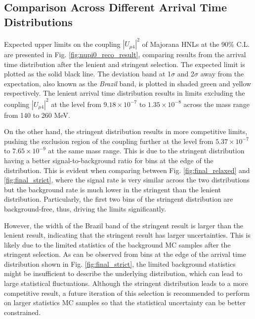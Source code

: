 \subsection{Comparison Across Different Arrival Time Distributions}

Expected upper limits on the coupling $|U_{\mu4}|^2$ of Majorana HNLs at the 90\% C.L. are presented in Fig. \ref{fig:nupi0_reco_result}, comparing results from the arrival time distribution after the lenient and stringent selection.
The expected limit is plotted as the solid black line.
The deviation band at 1$\sigma$ and 2$\sigma$ away from the expectation, also known as the \textit{Brazil} band, is plotted in shaded green and yellow respectively.
The lenient arrival time distribution results in limits excluding the coupling $|U_{\mu4}|^2$ at the level from $9.18 \times 10^{-7}$ to $1.35 \times 10^{-8}$ across the mass range from 140 to 260 MeV.

On the other hand, the stringent distribution results in more competitive limits, pushing the exclusion region of the coupling further at the level from $5.37 \times 10^{-7}$ to $7.65 \times 10^{-9}$ at the same mass range.
This is due to the stringent distribution having a better signal-to-background ratio for bins at the edge of the distribution.
This is evident when comparing between Fig. \ref{fig:final_relaxed} and \ref{fig:final_strict}, where the signal rate is very similar across the two distributions but the background rate is much lower in the stringent than the lenient distribution.
Particularly, the first two bins of the stringent distribution are background-free, thus, driving the limits significantly.

However, the width of the Brazil band of the stringent result is larger than the lenient result, indicating that the stringent result has larger uncertainties.
This is likely due to the limited statistics of the background MC samples after the stringent selection.
As can be observed from bins at the edge of the arrival time distribution shown in Fig. \ref{fig:final_strict}, the limited background statistics might be insufficient to describe the underlying distribution, which can lead to large statistical fluctuations.                                  
Although the stringent distribution leads to a more competitive result, a future iteration of this selection is recommended to perform on larger statistics MC samples so that the statistical uncertainty can be better constrained.

